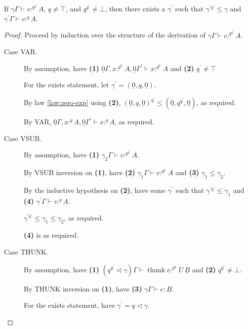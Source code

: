 \documentclass[acmsmall,screen,nonacm]{acmart}
\DeclareMathOperator{\thunk}{\text{thunk}}
\newcommand{\tee}{\vdash}
\DeclareMathOperator{\scale}{\mathbin{\triangleleft}}
\begin{document}
\begin{lemma}
\label{lem:new-modal-exp-invariant}
  If $\gamma\Gamma \tee v :^{q^{q^\prime}} A$, $q \ne \top$, and $q^{q^\prime} \ne \bot$, then there exists a $\gamma^\prime$ such that $\gamma^{\prime{q^\prime}} \le \gamma$ and $\gamma^\prime\Gamma \tee v :^q A$.
\end{lemma}

\begin{proof}
  Proceed by induction over the structure of the derivation of $\gamma\Gamma \tee v :^{q^{q^\prime}} A$.

  \begin{description}
    \item[Case VAR.]
    By assumption, have \textbf{(1)} $\underline{0}\Gamma, x :^{q^{q^\prime}} A, \underline{0}\Gamma^\prime \tee x :^{q^{q^\prime}} A$ and \textbf{(2)} $q^\prime \ne \top$

    For the exists statement, let $\gamma^\prime = (\underline{0}, q, \underline{0})$.

    By law \ref{law:zero-exp} using \textbf{(2)}, $(\underline{0}, q, \underline{0})^{q^\prime} \le (\underline{0}, q^{q^\prime}, \underline{0})$, as required.

    By VAR, $\underline{0}\Gamma, x :^q A, \underline{0}\Gamma^\prime \tee x :^q A$, as required.
    \\
    \item[Case VSUB.]
    By assumption, have \textbf{(1)} $\gamma_2\Gamma \tee v :^{q^{q^\prime}} A$.

    By VSUB inversion on \textbf{(1)}, have \textbf{(2)} $\gamma_1\Gamma \tee v :^{q^{q^\prime}} A$ and \textbf{(3)} $\gamma_1 \le \gamma_2$.

    By the inductive hypothesis on \textbf{(2)}, have some $\gamma^\prime$ such that $\gamma^{\prime{q^\prime}} \le \gamma_1$ and \textbf{(4)} $\gamma^\prime\Gamma \tee v :^q A.$

    $\gamma^{\prime{q^\prime}} \le \gamma_1 \le \gamma_2$, as required.

    \textbf{(4)} is as required.
    \\
    \item[Case THUNK.]
    By assumption, have \textbf{(1)} $(q^{q^\prime} \scale \gamma)\Gamma \tee \thunk e :^{q^{q^\prime}} U \, \underline{B}$  and \textbf{(2)} $q^{q^\prime} \neq \bot$.

    By THUNK inversion on \textbf{(1)}, have \textbf{(3)} $\gamma\Gamma \tee e : \underline{B}$.

    For the exists statement, have $\gamma^\prime = q \scale \gamma$.


\end{description}
\end{proof}
\end{document}
